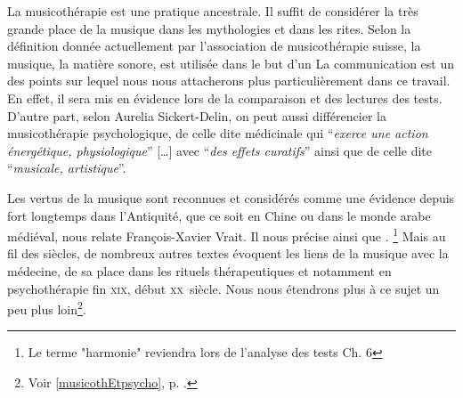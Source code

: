 La musicothérapie est une pratique ancestrale. Il suffit de considérer la très 
grande  place de la musique dans les mythologies et dans les rites. 
Selon la définition donnée actuellement  par l'association de musicothérapie suisse, 
la musique, la matière sonore, est utilisée dans le but d'un 
La communication est un des points sur lequel nous nous attacherons plus particulièrement 
dans ce travail. En effet, il sera mis en évidence lors de la comparaison et des lectures des 
tests.
D'autre part,  
 selon Aurelia Sickert-Delin, on peut aussi différencier la musicothérapie 
psychologique, de celle dite médicinale qui 
\enquote{\emph{exerce une action 
énergétique, physiologique}} [\dots] avec \enquote{\emph{des effets curatifs}}  
ainsi que de celle dite \enquote{\emph{musicale, artistique}}.
 	 
 	 
Les vertus de la musique sont reconnues et considérés comme une évidence depuis 
fort longtemps dans l'Antiquité, que ce soit en Chine ou dans le monde arabe 
médiéval, nous relate François-Xavier Vrait.  
 Il nous précise ainsi que \autocite[ch. III, p. 
96]{vrait_musicotherapie_2018}. \footnote{Le terme "harmonie" reviendra lors de l'analyse des tests Ch. 6}
Mais au fil des siècles, de nombreux autres 
textes évoquent les liens de la musique avec la médecine, de sa place dans les 
rituels thérapeutiques et notamment en psychothérapie fin \textsc{xix}\ieme, 
début \textsc{xx}\ieme\ siècle. Nous nous étendrons plus à ce sujet un peu plus 
loin\footnote{Voir \ref{musicothEtpsycho}, p. \pageref{musicothEtpsycho}.}.
 
